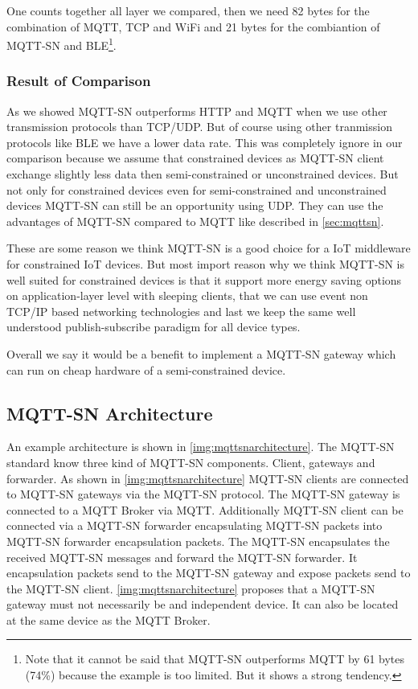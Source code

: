 One counts together all layer we compared, then we need 82 bytes for the combination of MQTT, TCP and WiFi and 21 bytes for the combiantion of MQTT-SN and BLE\footnote{Note that it cannot be said that MQTT-SN outperforms MQTT by 61 bytes (74\%) because the example is too limited. But it shows a strong tendency.}.

\subsubsection{Result of Comparison}
As we showed MQTT-SN outperforms HTTP and MQTT when we use other transmission protocols than TCP/UDP.
But of course using other tranmission protocols like BLE we have a lower data rate.
This was completely ignore in our comparison because we assume that constrained devices as MQTT-SN client exchange slightly less data then semi-constrained or unconstrained devices.
But not only for constrained devices even for semi-constrained and unconstrained devices MQTT-SN can still be an opportunity using UDP.
They can use the advantages of MQTT-SN compared to MQTT like described in \autoref{sec:mqttsn}.

These are some reason we think MQTT-SN is a good choice for a IoT middleware for constrained IoT devices.
But most import reason why we think MQTT-SN is well suited for constrained devices is that it support more energy saving options on application-layer level with sleeping clients, that we can use event non TCP/IP based networking technologies and last we keep the same well understood publish-subscribe paradigm for all device types.

Overall we say it would be a benefit to implement a MQTT-SN gateway which can run on cheap hardware of a semi-constrained device.

\subsection{MQTT-SN Architecture}\label{sec:mqttsnarchitecture}
An example architecture is shown in \autoref{img:mqttsnarchitecture}.
The MQTT-SN standard know three kind of MQTT-SN components.
Client, gateways and forwarder. As shown in \autoref{img:mqttsnarchitecture} MQTT-SN clients are connected to MQTT-SN gateways via the MQTT-SN protocol.
The MQTT-SN gateway is connected to a MQTT Broker via MQTT.
Additionally MQTT-SN client can be connected via a MQTT-SN forwarder encapsulating MQTT-SN packets into MQTT-SN forwarder encapsulation packets. The MQTT-SN encapsulates the received MQTT-SN messages and forward the MQTT-SN forwarder. It encapsulation packets send to the MQTT-SN gateway and expose packets send to the MQTT-SN client.
\autoref{img:mqttsnarchitecture} proposes that a MQTT-SN gateway must not necessarily be and independent device.
It can also be located at the same device as the MQTT Broker\cite{mqttsnstandard}.
